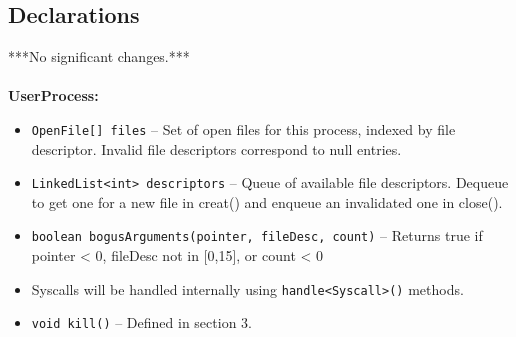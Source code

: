 \subsection{Declarations}
\large
***No significant changes.***\\\\
\normalsize
\textbf{UserProcess:}
\begin{itemize}
\item \texttt{OpenFile[] files} -- Set of open files for this process, indexed by file descriptor. Invalid file descriptors correspond to null entries.
\item \texttt{LinkedList<int> descriptors} -- Queue of available file descriptors. Dequeue to get one for a new file in creat() and enqueue an invalidated one in close().
\item \texttt{boolean bogusArguments(pointer, fileDesc, count)} -- Returns true if pointer < 0, fileDesc not in [0,15], or count < 0
\item Syscalls will be handled internally using \texttt{handle<Syscall>()} methods.
\item \texttt{void kill()} -- Defined in section 3.
\end{itemize}
